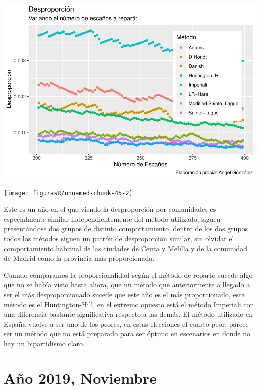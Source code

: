 \documentclass[12pt,a4paper,]{book}
\numberwithin{dummy}{section}
\theoremstyle{ocrenumbox}
\theoremstyle{blacknumex}
\theoremstyle{blacknumbox}
\theoremstyle{ocrenum}
\theoremstyle{ocrenum}
\begin{document}
\begin{center}\includegraphics[width=1\linewidth]{figurasR/unnamed-chunk-45-1} \end{center}

\begin{center}\texttt{[image: figurasR/unnamed-chunk-45-2]} \end{center}

Este es un año en el que viendo la desproporción por comunidades es
especialmente similar independientemente del método utilizado, siguen
presentándose dos grupos de distinto comportamiento, dentro de los dos
grupos todos los métodos siguen un patrón de desproporción similar, sin
olvidar el comportamiento habitual de las ciudades de Ceuta y Melilla y
de la comunidad de Madrid como la provincia más proporcionada.

Cuando comparamos la proporcionalidad según el método de reparto sucede
algo que no se había visto hasta ahora, que un método que anteriormente
a llegado a ser el más desproporcionado sucede que este año es el más
proporcionado, este método es el Huntington-Hill, en el extremo opuesto
está el método Imperiali con una diferencia bastante significativa
respecto a las demás. El método utilizado en España vuelve a ser uno de
los peores, en estas elecciones el cuarto peor, parece ser un método que
no está preparado para ser óptimo en escenarios en donde no hay un
bipartidismo claro.

\hypertarget{auxf1o-2019-noviembre}{%
\section{Año 2019, Noviembre}\label{auxf1o-2019-noviembre}}
\end{document}
